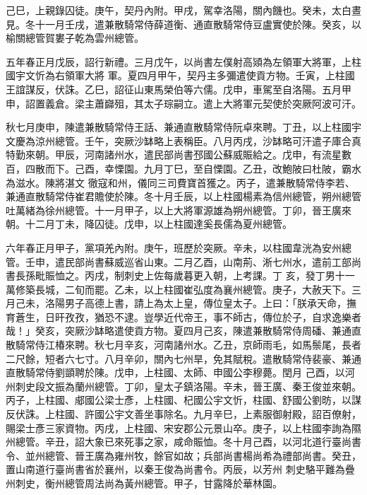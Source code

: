\begin{pinyinscope}
 己巳，上親錄囚徒。庚午，契丹內附。甲戌，駕幸洛陽，關內饑也。癸未，太白晝見。冬十一月壬戌，遣兼散騎常侍薛道衡、通直散騎常侍豆盧實使於陳。癸亥，以榆關總管賀婁子乾為雲州總管。



 五年春正月戊辰，詔行新禮。三月戊午，以尚書左僕射高熲為左領軍大將軍，上柱國宇文忻為右領軍大將
 軍。夏四月甲午，契丹主多彌遣使貢方物。壬寅，上柱國王誼謀反，伏誅。乙巳，詔征山東馬榮伯等六儒。戊申，車駕至自洛陽。五月甲申，詔置義倉。梁主蕭巋殂，其太子琮嗣立。遣上大將軍元契使於突厥阿波可汗。



 秋七月庚申，陳遣兼散騎常侍王話、兼通直散騎常侍阮卓來聘。丁丑，以上柱國宇文慶為涼州總管。壬午，突厥沙缽略上表稱臣。八月丙戌，沙缽略可汗遣子庫合真特勤來朝。甲辰，河南諸州水，遣民部尚書邳國公蘇威賑給之。戊申，有流星數百，四散而下。己酉，幸慄園。九月丁巳，至自慄園。乙丑，改鮑陂曰杜陂，霸水為滋水。陳將湛文
 徹寇和州，儀同三司費寶首獲之。丙子，遣兼散騎常侍李若、兼通直散騎常侍崔君贍使於陳。冬十月壬辰，以上柱國楊素為信州總管，朔州總管吐萬緒為徐州總管。十一月甲子，以上大將軍源雄為朔州總管。丁卯，晉王廣來朝。十二月丁未，降囚徒。戊申，以上柱國達奚長儒為夏州總管。



 六年春正月甲子，黨項羌內附。庚午，班歷於突厥。辛未，以柱國韋洸為安州總管。壬申，遣民部尚書蘇威巡省山東。二月乙酉，山南荊、淅七州水，遣前工部尚書長孫毗賑恤之。丙戌，制刺史上佐每歲暮更入朝，上考課。丁
 亥，發丁男十一萬修築長城，二旬而罷。乙未，以上柱國崔弘度為襄州總管。庚子，大赦天下。三月己未，洛陽男子高德上書，請上為太上皇，傳位皇太子。上曰：「朕承天命，撫育蒼生，日旰孜孜，猶恐不逮。豈學近代帝王，事不師古，傳位於子，自求逸樂者哉！」癸亥，突厥沙缽略遣使貢方物。夏四月己亥，陳遣兼散騎常侍周磻、兼通直散騎常侍江椿來聘。秋七月辛亥，河南諸州水。乙丑，京師雨毛，如馬鬃尾，長者二尺餘，短者六七寸。八月辛卯，關內七州旱，免其賦稅。遣散騎常侍裴豪、兼通直散騎常侍劉顗聘於陳。戊申，上柱國、太師、申國公李穆薨。閏月
 己酉，以河州刺史段文振為蘭州總管。丁卯，皇太子鎮洛陽。辛未，晉王廣、秦王俊並來朝。丙子，上柱國、郕國公梁士彥，上柱國、杞國公宇文忻，柱國、舒國公劉昉，以謀反伏誅。上柱國、許國公宇文善坐事除名。九月辛巳，上素服御射殿，詔百僚射，賜梁士彥三家資物。丙戌，上柱國、宋安郡公元景山卒。庚子，以上柱國李詢為隰州總管。辛丑，詔大象已來死事之家，咸命賑恤。冬十月己酉，以河北道行臺尚書令、並州總管、晉王廣為雍州牧，餘官如故；兵部尚書楊尚希為禮部尚書。癸丑，置山南道行臺尚書省於襄州，以秦王俊為尚書令。丙辰，以芳州
 刺史駱平難為疊州刺史，衡州總管周法尚為黃州總管。甲子，甘露降於華林園。




\end{pinyinscope}
